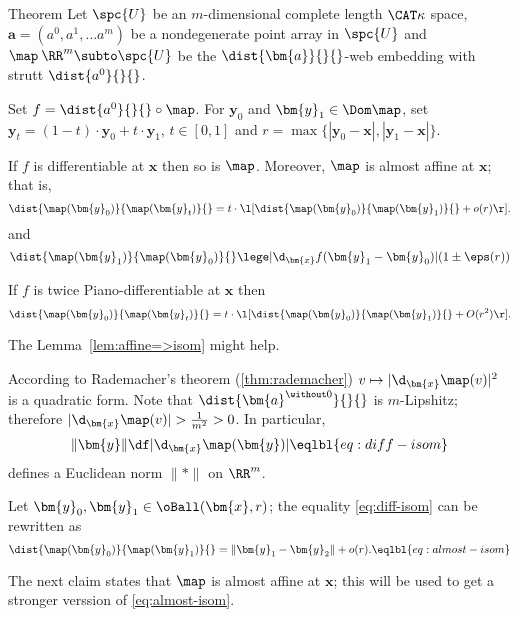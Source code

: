 \begin{thm}{Theorem}\label{thm:loc-lip-inverse+}
Let $\spc{U}$ be an $m$-dimensional complete length $\CAT\kappa$ space, 
$\bm{a}=(a^0,a^1,\dots a^m)$ be a nondegenerate point array in $\spc{U}$
and $\map\:\RR^m\subto\spc{U}$ be the $\dist{\bm{a}}{}{}$-web embedding 
with strutt $\dist{a^0}{}{}$.

Set $f=\dist{a^0}{}{}\circ\map$.
For $\bm{y}_0$ and $\bm{y}_1\in\Dom\map$,
set $\bm{y}_t=(1-t)\cdot \bm{y}_0+t\cdot \bm{y}_1 $, $t\in [0,1]$
and $r=\max\{|\bm{y}_0-\bm{x}|,|\bm{y}_1-\bm{x}|\}$.

\begin{subthm}{}
If $f$ is differentiable at $\bm{x}$ then so is $\map$.
Moreover, $\map$ is almost affine at $\bm{x}$;
that is,
\[\dist{\map(\bm{y}_0)}{\map(\bm{y}_t)}{}
=
t
\cdot
\l[
\dist{\map(\bm{y}_0)}{\map(\bm{y}_1)}{}
+
o(r)
\r].
\]
and 
\[
\dist{\map(\bm{y}_1)}{\map(\bm{y}_0)}{}
\lege
|\d_{\bm{x}}f(\bm{y}_1-\bm{y}_0)|(1\pm\eps(r))%
\]

\end{subthm}

\begin{subthm}{}
If $f$ is twice Piano-differentiable at $\bm{x}$ 
then 
\[\dist{\map(\bm{y}_0)}{\map(\bm{y}_t)}{}
=
t
\cdot
\l[
\dist{\map(\bm{y}_0)}{\map(\bm{y}_1)}{}
+
O(r^2)
\r].
\]
\end{subthm}

\end{thm}

The Lemma~\ref{lem:affine=>isom} might help.











According to Rademacher's theorem (\ref{thm:rademacher}) 
$v\mapsto |\d_{\bm{x}}\map(v)|^2$
is a quadratic form.
Note that $\dist{\bm{a}^{\without 0}}{}{}$ is $m$-Lipshitz;
therefore $|\d_{\bm{x}}\map(v)|>\tfrac1{m^2}>0$.
In particular, 
\[
\|\bm{y}\|
\df
|\d_{\bm{x}}\map(\bm{y})|
\eqlbl{eq:diff-isom}
\]
defines a Euclidean norm $\|{*}\|$ on $\RR^m$.

Let $\bm{y}_0,\bm{y}_1\in\oBall(\bm{x},r)$;
the equality \ref{eq:diff-isom} can be rewritten as
\[\dist{\map(\bm{y}_0)}{\map(\bm{y}_1)}{}=\|\bm{y}_1-\bm{y}_2\|+o(r).
\eqlbl{eq:almost-isom}\]

The next claim states that $\map$ is almost affine at $\bm{x}$;
this will be used to get a stronger verssion of \ref{eq:almost-isom}.

